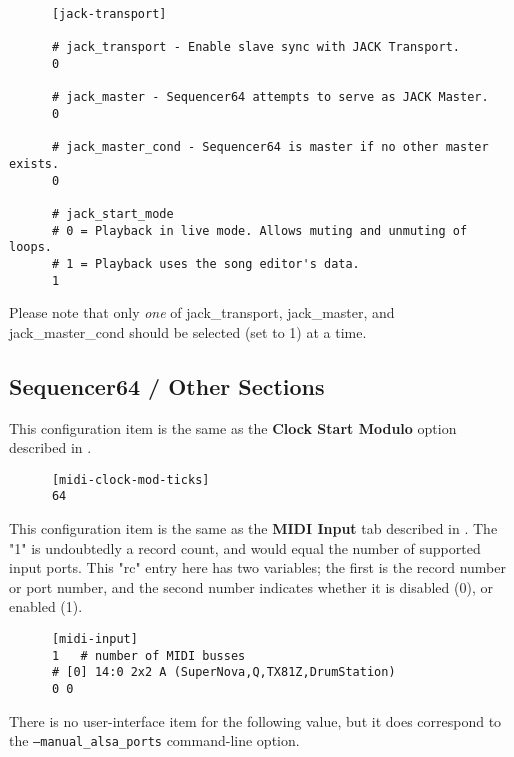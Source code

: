   \begin{verbatim}
      [jack-transport]

      # jack_transport - Enable slave sync with JACK Transport.
      0

      # jack_master - Sequencer64 attempts to serve as JACK Master.
      0

      # jack_master_cond - Sequencer64 is master if no other master exists.
      0

      # jack_start_mode
      # 0 = Playback in live mode. Allows muting and unmuting of loops.
      # 1 = Playback uses the song editor's data.
      1
   \end{verbatim}

   Please note that only \textsl{one} of
   jack\_transport, jack\_master, and jack\_master\_cond should be selected
   (set to 1) at a time.

\subsection{Sequencer64 / Other Sections}
\label{subsec:seq64_rc_file_other_midi}

   This configuration item is the same as the
   \textbf{Clock Start Modulo} option described in
   .

   \begin{verbatim}
      [midi-clock-mod-ticks]
      64
   \end{verbatim}

   This configuration item is the same as the 
   \textbf{MIDI Input} tab described in
   .
   The "1" is undoubtedly a record count, and would equal the number of
   supported input ports.
   This "rc" entry here has two variables; the first is the record number or
   port number, and the second number indicates whether it is disabled (0),
   or enabled (1).

   \begin{verbatim}
      [midi-input]
      1   # number of MIDI busses
      # [0] 14:0 2x2 A (SuperNova,Q,TX81Z,DrumStation)
      0 0
   \end{verbatim}

   There is no user-interface item for the following value, but
   it does correspond to the \texttt{--manual\_alsa\_ports} command-line
   option.

